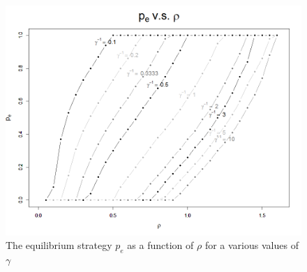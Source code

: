 \documentclass[11pt]{article}
\numberwithin{equation}{section}
\begin{document}
\begin{figure}[h!]
  \centering
    \includegraphics[width=1\textwidth]{peq_vs_rho.png}
    \caption{The equilibrium strategy $p_{e}$ as a function of $\rho$ for a various values of $\gamma$}
    \label{PeqVsRho}
\end{figure}
\end{document}
